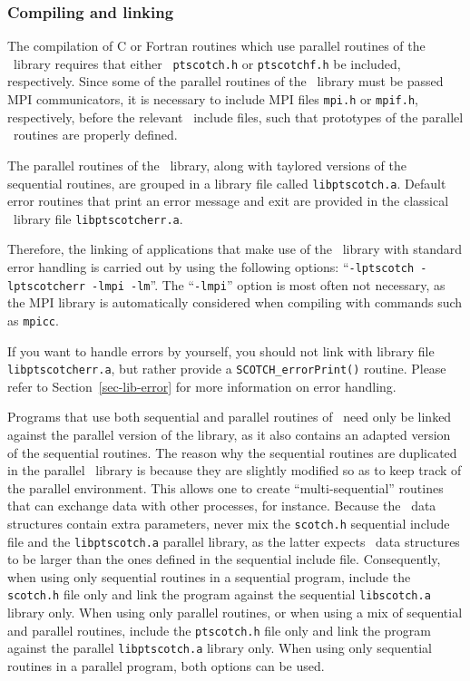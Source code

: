 \subsubsection{Compiling and linking}

The compilation of C or Fortran routines which use parallel
routines of the \libscotch\ library requires that either {\tt
ptscotch.h} or {\tt ptscotchf.h} be included, respectively. Since some
of the parallel routines of the \libscotch\ library must be passed MPI
communicators, it is necessary to include MPI files {\tt mpi.h} or
{\tt mpif.h}, respectively, before the relevant \ptscotch\ include
files, such that prototypes of the parallel \libscotch\ routines are
properly defined.

The parallel routines of the \libscotch\ library, along with
taylored versions of the sequential routines, are grouped in a
library file called {\tt libptscotch.a}. Default error routines that
print an error message and exit are provided in the classical
\scotch\ library file {\tt libptscotcherr.a}.

Therefore, the linking of applications that make use of the
\libscotch\ library with standard error handling is carried out by
using the following options: ``{\tt -lptscotch -lptscotcherr -lmpi -lm}''.
The ``{\tt -lmpi}'' option is most often not necessary, as the MPI
library is automatically considered when compiling with commands such
as {\tt mpicc}.

If you want to handle errors by yourself, you should not link with
library file {\tt libptscotcherr.a}, but rather provide a
{\tt SCOTCH\_\lbt error\lbt Print()} routine. Please refer to
Section~\ref{sec-lib-error} for more information on error handling.

Programs that use both sequential and parallel routines of
\scotch\ need only be linked against the parallel version of the
library, as it also contains an adapted version of the sequential
routines. The reason why the sequential routines are duplicated in the
parallel \ptscotch\ library is because they are slightly modified so
as to keep track of the parallel environment. This allows one to
create ``multi-sequential'' routines that can exchange data with other
processes, for instance. Because the \libscotch\ data structures
contain extra parameters, never mix the \texttt{scotch.h} sequential
include file and the \texttt{libptscotch.a} parallel library, as the
latter expects \scotch\ data structures to be larger than the ones
defined in the sequential include file. Consequently, when using only
sequential routines in a sequential program, include the
\texttt{scotch.h} file only and link the program against the sequential
\texttt{libscotch.a} library only. When using only parallel routines,
or when using a mix of sequential and parallel routines, include the
\texttt{ptscotch.h} file only and link the program against the parallel
\texttt{libptscotch.a} library only. When using only sequential
routines in a parallel program, both options can be used.

